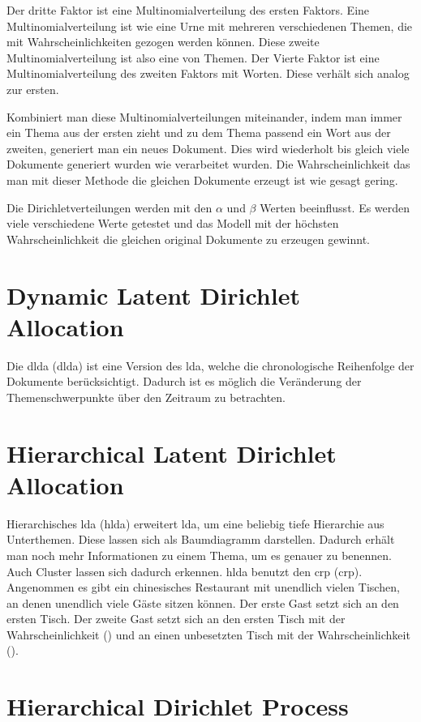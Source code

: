Der dritte Faktor ist eine Multinomialverteilung des ersten Faktors. Eine Multinomialverteilung ist wie eine Urne mit mehreren verschiedenen Themen, die mit Wahrscheinlichkeiten gezogen werden können. Diese zweite Multinomialverteilung ist also eine von Themen. Der Vierte Faktor ist eine Multinomialverteilung des zweiten Faktors mit Worten. Diese verhält sich analog zur ersten.

Kombiniert man diese Multinomialverteilungen miteinander, indem man immer ein Thema aus der ersten zieht und zu dem Thema passend ein Wort aus der zweiten, generiert man ein neues Dokument. Dies wird wiederholt bis gleich viele Dokumente generiert wurden wie verarbeitet wurden. Die Wahrscheinlichkeit das man mit dieser Methode die gleichen Dokumente erzeugt ist wie gesagt gering.

Die Dirichletverteilungen werden mit den $\alpha$ und $\beta$ Werten beeinflusst. Es werden viele verschiedene Werte getestet und das Modell mit der höchsten Wahrscheinlichkeit die gleichen original Dokumente zu erzeugen gewinnt.






\section{Dynamic Latent Dirichlet Allocation}
Die \acl{dlda} (\ac{dlda}) ist eine Version des \ac{lda}, welche die chronologische Reihenfolge der Dokumente berücksichtigt. Dadurch ist es möglich die Veränderung der Themenschwerpunkte über den Zeitraum zu betrachten. \parencite[vgl.][]{dynamicLDA}

\section{Hierarchical Latent Dirichlet Allocation}
Hierarchisches \ac{lda} (\ac{hlda}) erweitert \ac{lda}, um eine beliebig tiefe  Hierarchie aus Unterthemen. \parencite[vgl.][]{griffiths2004hierarchical} Diese lassen sich als Baumdiagramm darstellen. Dadurch erhält man noch mehr Informationen zu einem Thema, um es genauer zu benennen. Auch Cluster lassen sich dadurch erkennen. \ac{hlda} benutzt den \acl{crp} (\ac{crp}). Angenommen es gibt ein chinesisches Restaurant mit unendlich vielen Tischen, an denen unendlich viele Gäste sitzen können. Der erste Gast setzt sich an den ersten Tisch. Der zweite Gast setzt sich an den ersten Tisch mit der Wahrscheinlichkeit () und an einen unbesetzten Tisch mit der Wahrscheinlichkeit (). 

\section{Hierarchical Dirichlet Process}
